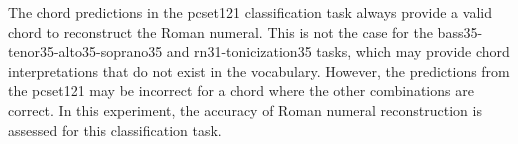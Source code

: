 
The chord predictions in the \gls{pcset121} classification
task always provide a valid chord to reconstruct the Roman
numeral. This is not the case for the
\gls{bass35}-\gls{tenor35}-\gls{alto35}-\gls{soprano35} and
\gls{rn31}-\gls{tonicization35} tasks, which may provide
chord interpretations that do not exist in the vocabulary.
However, the predictions from the \gls{pcset121} may be
incorrect for a chord where the other combinations are
correct. In this experiment, the accuracy of Roman numeral
reconstruction is assessed for this classification task.
